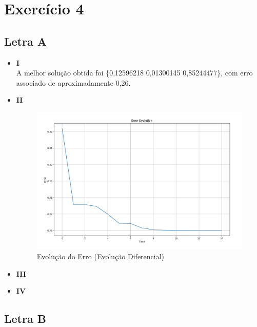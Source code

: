 \documentclass[a4paper, 12pt]{article}
\begin{document}
\section*{Exercício 4}

\subsection*{Letra A}

\begin{itemize}
    \item \textbf{I}\\
    A melhor solução obtida foi \{0,12596218 \textbar\hspace{0.1cm} 0,01300145 \textbar\hspace{0.1cm} 0,85244477\}, com erro associado de aproximadamente 0,26.
    \item \textbf{II}
    \begin{figure}[H]
        \centering
        \includegraphics[width=1\textwidth]{Images/Exercise 4/de_error.png}
        \vspace*{-1cm}
        \caption{Evolução do Erro (Evolução Diferencial)}
        \label{fig:exampleFig13}
    \end{figure}
    \item \textbf{III}
    \item \textbf{IV}
\end{itemize}

\pagebreak

\subsection*{Letra B}
\end{document}
